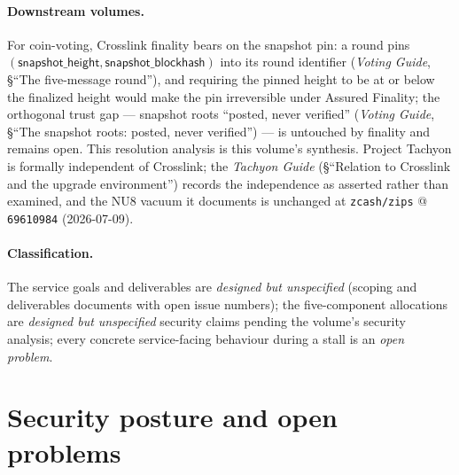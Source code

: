 \documentclass[11pt,a4paper]{article}
\theoremstyle{definition}
\begin{document}
\paragraph{Downstream volumes.} For coin-voting, Crosslink finality bears
on the snapshot pin: a round pins $(\textsf{snapshot\_height},
\textsf{snapshot\_blockhash})$ into its round identifier (\emph{Voting
Guide}, \S``The five-message round''), and requiring the pinned height to
be at or below the finalized height would make the pin irreversible under
Assured Finality; the orthogonal trust gap --- snapshot roots ``posted,
never verified'' (\emph{Voting Guide}, \S``The snapshot roots: posted,
never verified'') --- is untouched by finality and remains open. This
resolution analysis is this volume's synthesis.
Project Tachyon is formally independent of Crosslink; the \emph{Tachyon
Guide} (\S``Relation to Crosslink and the upgrade environment'') records
the independence as asserted rather than examined, and the NU8 vacuum it
documents is unchanged at \texttt{zcash/zips} @ \texttt{69610984}
(2026-07-09).

\paragraph{Classification.} The service goals and deliverables are
\emph{designed but unspecified} (scoping and deliverables documents with
open issue numbers); the five-component allocations are \emph{designed
but unspecified} security claims pending the volume's security analysis;
every concrete service-facing behaviour during a stall is an \emph{open
problem}.

\section{Security posture and open problems}\label{sec:xl-security}
\end{document}
